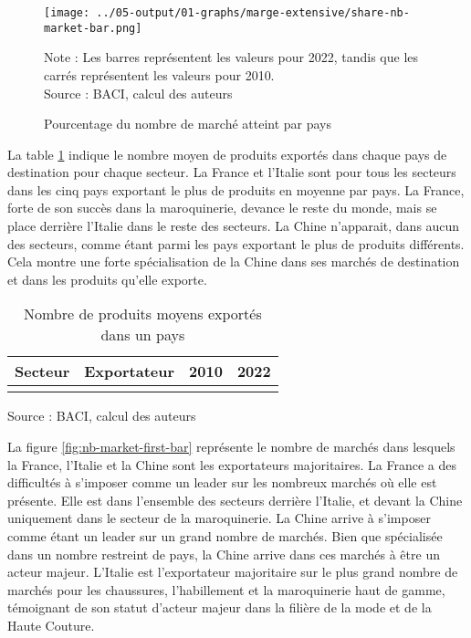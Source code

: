 \documentclass[french,10pt,a4paper]{article}
\begin{document}
\begin{figure}[!h]
  \centering
  \texttt{[image: ../05-output/01-graphs/marge-extensive/share-nb-market-bar.png]}
  \captionsetup{justification=justified, singlelinecheck=false, font=small}
  \caption*{Note : Les barres représentent les valeurs pour 2022, tandis que les carrés représentent les valeurs pour 2010. \\
  Source : BACI, calcul des auteurs}
  \captionsetup{justification=centering, singlelinecheck=true, font=normalsize}
  \caption{Pourcentage du nombre de marché atteint par pays}
  \label{fig:nb-market-bar}
\end{figure}

La table \ref{tab:table-nb-mean-product-export} indique le nombre moyen de produits exportés dans chaque pays de destination pour chaque secteur. La France et l'Italie sont pour tous les secteurs dans les cinq pays exportant le plus de produits en moyenne par pays. La France, forte de son succès dans la maroquinerie, devance le reste du monde, mais se place derrière l'Italie dans le reste des secteurs. La Chine n'apparait, dans aucun des secteurs, comme étant parmi les pays exportant le plus de produits différents. Cela montre une forte spécialisation de la Chine dans ses marchés de destination et dans les produits qu'elle exporte. 

\begin{table}[ht]
  \centering
  \begin{tabular}{|c|c|c|c|}
    \hline
   Secteur & Exportateur & 2010 & 2022 \\
    \hline
    \\
    \hline
  \end{tabular}
  \captionsetup{justification=raggedright,singlelinecheck=false, font=small}
  \caption*{Source : BACI, calcul des auteurs}
  \captionsetup{justification=centering, singlelinecheck=true, font=normalsize}
  \caption{Nombre de produits moyens exportés dans un pays}
  \label{tab:table-nb-mean-product-export}
\end{table}

La figure \ref{fig:nb-market-first-bar} représente le nombre de marchés dans lesquels la France, l'Italie et la Chine sont les exportateurs majoritaires. La France a des difficultés à s'imposer comme un leader sur les nombreux marchés où elle est présente. Elle est dans l'ensemble des secteurs derrière l'Italie, et devant la Chine uniquement dans le secteur de la maroquinerie. La Chine arrive à s'imposer comme étant un leader sur un grand nombre de marchés. Bien que spécialisée dans un nombre restreint de pays, la Chine arrive dans ces marchés à être un acteur majeur. L'Italie est l'exportateur majoritaire sur le plus grand nombre de marchés pour les chaussures, l'habillement et la maroquinerie haut de gamme, témoignant de son statut d'acteur majeur dans la filière de la mode et de la Haute Couture.
\end{document}
